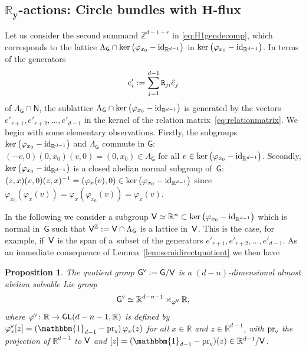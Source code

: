 \documentclass[10pt,a4paper]{amsart}
\numberwithin{equation}{section}
\newcommand{\Z}{\zed}
\def\Id{{\rm id}}
\def\V{{\sf V}}
\newcommand{\unit}{\mathbbm{1}} 			%
\newcommand{\sfG}{\mathsf{G}}
\newcommand{\sfN}{\mathsf{N}}
\newcommand{\sfGL}{\mathsf{GL}}
\newcommand{\R}{\real}
\newcommand{\zed}{{\mathbb Z}} %
\newcommand{\real}{{\mathbb R}} %
\newtheorem{Proposition}[Theorem]{Proposition}
 { \theoremstyle{definition}
\newtheorem{Definition}[Theorem]{Definition}
\newtheorem{Note}[Theorem]{Note}
\newtheorem{Example}[Theorem]{Example}
\newtheorem{Remark}[Theorem]{Remark} }
\begin{document}
\subsection[$\real_y$-actions: Circle bundles with $H$-flux]{$\boldsymbol{\real_y}$-actions: Circle bundles with $\boldsymbol{H}$-flux}\label{sec:Rygen}

Let us consider the second summand $\Z^{d-1-r}$ in
\eqref{eq:H1gendecomp}, which corresponds to the lattice $\Lambda_\sfG\cap
\ker\big(\varphi_{x_0}-{\rm id}_{\R^{d-1}}\big)$ in $\ker\big(\varphi_{x_0}-\Id_{\R^{d-1}}\big)$.
In terms of the generators
\[
e'_i:=\sum_{j=1}^{d-1} {\tt R}_{ji} \hat e_j
\]
of
$\Lambda_\sfG\cap \sfN$, the sublattice $\Lambda_\sfG\cap
\ker\big(\varphi_{x_0}-\Id_{\R^{d-1}}\big)$ is generated by the
vectors $e'_{r+1},e'_{r+2},\ldots,e'_{d-1}$ in the kernel of the
relation matrix~\eqref{eq:relationmatrix}. We
 begin with some
elementary observations. Firstly, the subgroups $\ker\big(\varphi_{x_0}-\Id_{\R^{d-1}}\big)$ and
$\Lambda_\sfG$ commute in $\sfG$:
$(-v,0) (0,x_0) (v,0)=(0,x_0)\in \Lambda_\sfG$ for all $v\in \ker\big(\varphi_{x_0}-\Id_{\R^{d-1}}\big)$.
Secondly, $\ker\big(\varphi_{x_0}-\Id_{\R^{d-1}}\big)$ is a closed abelian
normal subgroup of~$\sfG$:
$(z,x) (v,0) (z,x)^{-1}=(\varphi_x(v),0)\in
\ker\big(\varphi_{x_0}-\Id_{\R^{d-1}}\big)$ since
$\varphi_{x_0}(\varphi_x(v))=\varphi_{x}(\varphi_{x_0}(v))=\varphi_x(v)$.

In the following we consider a subgroup $\V\simeq\real^n\subset
\ker\big(\varphi_{x_0}-\Id_{\R^{d-1}}\big)$ which is normal in~$\sfG$
such that $\V^\zed:=\V\cap\Lambda_\sfG$ is a lattice in~$\V$.
This is the case, for example, if~$\V$ is the span of a~subset of the generators
 $e'_{r+1},e'_{r+2},\ldots, e'_{d-1}$. As an immediate consequence of
 Lemma~\ref{lem:semidirectquotient} we then have

\begin{Proposition}\label{lem:quotientgroup}
The quotient group $\sfG^{\text{\tiny$\V$}}:=\sfG/\V$ is a $(d{-}n)$-dimensional almost
abelian solvable Lie group
$$
\sfG^{\text{\tiny$\V$}}\simeq\R^{d-n-1}
\rtimes_{\varphi^{\text{\tiny$\V$}}}\R ,
$$
where $\varphi^{\text{\tiny{$\V$}}}\colon \R\to\sfGL(d-n-1,\R)$ is
defined by $\varphi^{\text{\tiny{$\V$}}}_x[z]
=(\unit_{d-1}-{\rm pr}_{\text{\tiny{$\V$}}})\,\varphi_x(z)$ for
all $x\in\R$ and $z\in \real^{d-1}$, with ${\rm pr}_{\text{\tiny{$\V$}}}$ the projection
of $\R^{d-1}$ to $\V$ and $[z]=(\unit_{d-1}-{\rm
 pr}_{\text{\tiny{$\V$}}})(z)\in \real^{d-1}/\V$.
\end{Proposition}
\end{document}
